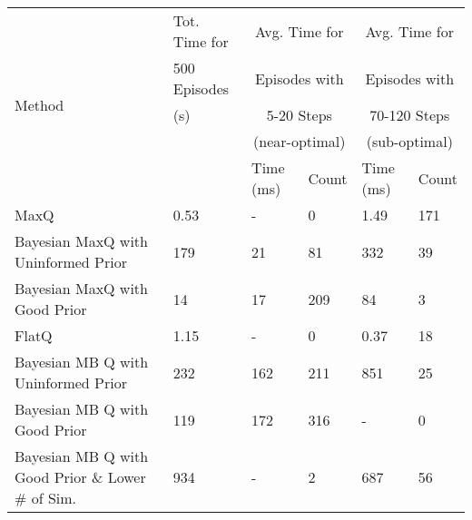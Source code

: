 \begin{table}[t]
\caption{}
\label{timing-table}
\begin{center}
\begin{tabular}{| p{3cm} | l | l | l | l | l |}
\hline
\multirow{5}{*}{Method} 	&Tot. Time  for	&\multicolumn{2}{|c|}{Avg. Time for}  &\multicolumn{2}{|c|}{Avg. Time for}			\\ 
						&500 Episodes 	&\multicolumn{2}{|c|}{Episodes with} 	 &\multicolumn{2}{|c|}{Episodes with}			\\
						&(s)				&\multicolumn{2}{|c|}{5-20 Steps}	&\multicolumn{2}{|c|}{70-120 Steps} 		\\ 
						&				&\multicolumn{2}{|c|}{(near-optimal)}		&\multicolumn{2}{|c|}{(sub-optimal)}				\\ \cline{3-6}
						&				&Time (ms)	&Count				&Time (ms)	&Count \\ \hline
						
MaxQ							&0.53	&- 		&0		&1.49 	&171				\\ \hline
Bayesian MaxQ with Uninformed Prior	&179	&21		&81 		&332  	&39 				\\ \hline
Bayesian MaxQ with Good Prior		&14		&17 		&209 	&84 		&3 				\\ \hline
FlatQ							&1.15	&- 		&0		&0.37	&18			\\ \hline
Bayesian MB Q	 with Uninformed Prior	&232	&162 	&211 	&851	&25 					\\ \hline
Bayesian MB Q with Good Prior		&119	&172 	&316 	&- 		&0 				\\ \hline
Bayesian MB Q with Good Prior \& Lower \# of Sim. 	
								&934	&- 		&2		&687	&56		\\ \hline
\end{tabular}
\end{center}
\end{table}
